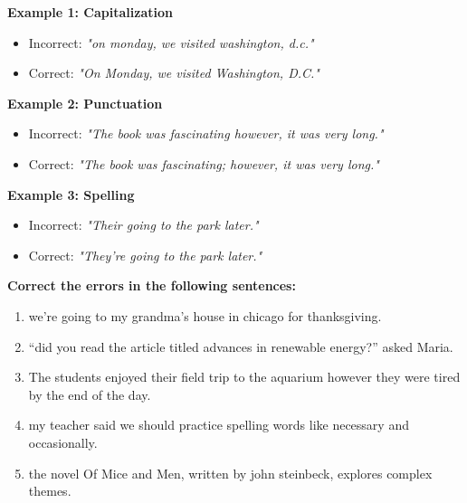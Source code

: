 \documentclass[12pt]{article}
\begin{document}
\begin{tcolorbox}[colframe=black!60, colback=white, 
coltitle=black, colbacktitle=black!15, fonttitle=\bfseries\Large, 
title=Examples, halign title=center, left=10pt, right=10pt, top=10pt, bottom=15pt]

\textbf{Example 1: Capitalization}
\begin{itemize}
    \item Incorrect: \textit{"on monday, we visited washington, d.c."}  
    \item Correct: \textit{"On Monday, we visited Washington, D.C."}
\end{itemize}

\textbf{Example 2: Punctuation}
\begin{itemize}
    \item Incorrect: \textit{"The book was fascinating however, it was very long."}  
    \item Correct: \textit{"The book was fascinating; however, it was very long."}
\end{itemize}

\textbf{Example 3: Spelling}
\begin{itemize}
    \item Incorrect: \textit{"Their going to the park later."}  
    \item Correct: \textit{"They're going to the park later."}
\end{itemize}

\end{tcolorbox}

\vspace{1em}

\begin{tcolorbox}[colframe=black!60, colback=white, 
coltitle=black, colbacktitle=black!15, fonttitle=\bfseries\Large, 
title=Guided Practice, halign title=center, left=10pt, right=10pt, top=10pt, bottom=15pt]
\textbf{Correct the errors in the following sentences:}
\begin{enumerate}[itemsep=3em]
    \item we’re going to my grandma's house in chicago for thanksgiving.
    \item “did you read the article titled advances in renewable energy?” asked Maria.
    \item The students enjoyed their field trip to the aquarium however they were tired by the end of the day.
    \item my teacher said we should practice spelling words like necessary and occasionally.
    \item the novel Of Mice and Men, written by john steinbeck, explores complex themes.
\end{enumerate}
\end{tcolorbox}
\end{document}
